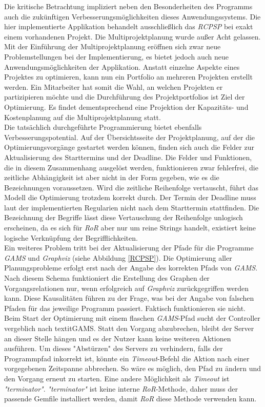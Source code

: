 \documentclass[a4paper,12pt,parskip,bibtotoc,liststotoc]{article}
\begin{document}
Die kritische Betrachtung impliziert neben den Besonderheiten des Programms auch die zukünftigen Verbesserungsmöglichkeiten dieses Anwendungssystems. Die hier implementierte Applikation behandelt ausschließlich das \textit{RCPSP} bei exakt einem vorhandenen Projekt. Die Multiprojektplanung wurde außer Acht gelassen. Mit der Einführung der Multiprojektplanung eröffnen sich zwar neue Problemstellungen bei der Implementierung, es bietet jedoch auch neue Anwendungsmöglichkeiten der Applikation. Anstatt einzelne Aspekte eines Projektes zu optimieren, kann nun ein Portfolio an mehreren Projekten erstellt werden. Ein Mitarbeiter hat somit die Wahl, an welchen Projekten er partizipieren möchte und die Durchführung des Projektportfolios ist Ziel der Optimierung. Es findet dementsprechend eine Projektion der Kapazitäts- und Kostenplanung auf die Multiprojektplanung statt.\\
Die tatsächlich durchgeführte Programmierung bietet ebenfalls Verbesserungspotential. Auf der Übersichtsseite der Projektplanung, auf der die Optimierungsvorgänge gestartet werden können, finden sich auch die Felder zur Aktualisierung des Starttermins und der Deadline. Die Felder und Funktionen, die in diesem Zusammenhang ausgelöst werden, funktionieren zwar fehlerfrei, die zeitliche Abhängigkeit ist aber nicht in der Form gegeben, wie es die Bezeichnungen voraussetzen. Wird die zeitliche Reihenfolge vertauscht, führt das Modell die Optimierung trotzdem korrekt durch. Der Termin der Deadline muss laut der implementierten Regularien nicht nach dem Starttermin stattfinden. Die Bezeichnung der Begriffe lässt diese Vertauschung der Reihenfolge unlogisch erscheinen, da es sich für \textit{RoR} aber nur um reine Strings handelt, existiert keine logische Verknüpfung der Begrifflichkeiten.\\
Ein weiteres Problem tritt bei der Aktualisierung der Pfade für die Programme \textit{GAMS} und \textit{Graphviz} (siehe Abbildung \ref{RCPSP}). Die Optimierung aller Planungsprobleme erfolgt erst nach der Angabe des korrekten Pfads von \textit{GAMS}. Nach diesem Schema funktioniert die Erstellung des Graphen der Vorgangsrelationen nur, wenn erfolgreich auf \textit{Graphviz} zurückgegriffen werden kann. Diese Kausalitäten führen zu der Frage, was bei der Angabe von falschen Pfaden für das jeweilige Programm passiert. Faktisch funktionieren sie nicht. Beim Start der Optimierung mit einem flaschen \textit{GAMS}-Pfad sucht der Controller vergeblich nach textit{GAMS}. Statt den Vorgang abzubrechen, bleibt der Server an dieser Stelle hängen und es der Nutzer kann keine weiteren Aktionen ausführen. Um dieses "Abstürzen" des Servers zu verhindern, falls der Programmpfad inkorrekt ist, könnte ein \textit{Timeout}-Befehl die Aktion nach einer vorgegebenen Zeitspanne abbrechen. So wäre es möglich, den Pfad zu ändern und den Vorgang erneut zu starten. Eine andere Möglichkeit als \textit{Timeout} ist \textit{"terminator"}. \textit{"terminator"} ist keine interne \textit{RoR}-Methode, daher muss der passende Gemfile installiert werden, damit \textit{RoR} diese Methode verwenden kann.\\
\end{document}
